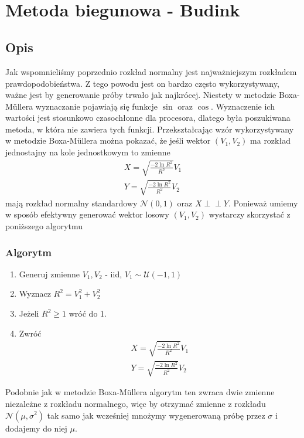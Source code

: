 \documentclass[12pt]{mwrep}
\newcommand{\indep}{\perp \!\!\! \perp}
\begin{document}
	
	
	\section{Metoda biegunowa\textsuperscript{\cite{polar}} - Budink}
	\subsection{Opis}
	Jak wspomnieliśmy poprzednio rozkład normalny jest najważniejszym rozkładem prawdopodobieństwa. Z tego powodu jest on bardzo często wykorzystywany, ważne jest by generowanie próby trwało jak najkrócej. Niestety w metodzie Boxa-M{\"u}llera wyznaczanie pojawiają się funkcje $\sin$ oraz $\cos$. Wyznaczenie ich wartości jest stosunkowo czasochłonne dla procesora, dlatego była poszukiwana metoda, w która nie zawiera tych funkcji. Przekształcając wzór wykorzystywany w metodzie Boxa-M\"ullera można pokazać, że jeśli wektor $(V_1, V_2)$ ma rozkład jednostajny na kole jednostkowym to zmienne
	\begin{equation}
		\begin{split}
			X=\sqrt{\frac{-2\ln R^2}{R^2}}V_1\\
			Y=\sqrt{\frac{-2\ln R^2}{R^2}}V_2
		\end{split}
	\end{equation}
	mają rozkład normalny standardowy $\mathcal{N}(0,1)$ oraz $X \indep Y$. Ponieważ umiemy w sposób efektywny generować wektor losowy $(V_1, V_2)$ wystarczy skorzystać z poniższego algorytmu
	\subsubsection{Algorytm}
	\begin{enumerate}[leftmargin=10mm]
		\item Generuj zmienne $V_1, V_2$ - iid, $V_1\sim\mathcal{U}(-1,1)$
		\item Wyznacz $R^2=V_1^2+V_2^2$
		\item Jeżeli $R^2\ge 1$ wróć do 1.
		\item Zwróć
		\begin{equation}
			\begin{split}
				X=\sqrt{\frac{-2\ln R^2}{R^2}}V_1\\
				Y=\sqrt{\frac{-2\ln R^2}{R^2}}V_2
			\end{split}
		\end{equation}
	\end{enumerate}
	Podobnie jak w metodzie Boxa-M{\"u}llera algorytm ten zwraca dwie zmienne niezależne z rozkładu normalnego, więc by otrzymać zmienne z rozkładu $\mathcal{N}(\mu,\sigma^2)$ tak samo jak wcześniej mnożymy wygenerowaną próbę przez $\sigma$ i dodajemy do niej $\mu$.
	
\end{document}
